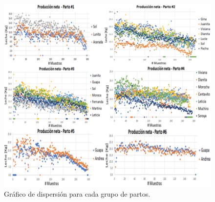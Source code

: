 \begin{figure}[H]
	 \begin{center}
	 \includegraphics[scale=0.675]{img/svnetas.png}
	 \end{center}
	 \caption{Gráfico de dispersión para cada grupo de partos. \label{svnetaspng}}
\end{figure}




